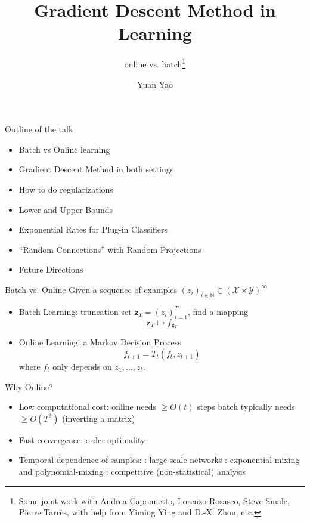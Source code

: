 \documentclass[pdf,slideColor,colorBG]{prosper}
\title{Gradient Descent Method in Learning}
\subtitle{online vs. batch\footnote{Some joint work with Andrea Caponnetto, Lorenzo Rosasco, Steve Smale, Pierre Tarr\`es, with help from
Yiming Ying and D.-X. Zhou, etc.}}
\author{Yuan Yao}
\theoremstyle{theorem}
\theoremstyle{definition}
\theoremstyle{remark}
\def\X{{\mathcal X}}
\def\Y{{\mathcal Y}}
\def\N{{\mathbb N}}
\def\z{{\mathbf z}}
\begin{document}
\maketitle

\begin{slide}{Outline of the talk}
\begin{itemize}
    \item Batch vs Online learning
    \item Gradient Descent Method in both settings
    \item How to do regularizations
    \item Lower and Upper Bounds
    \item Exponential Rates for Plug-in Classifiers
    \item ``Random Connections'' with Random Projections
    \item Future Directions
\end{itemize}

\end{slide}

%
\begin{slide}{Batch vs. Online}
Given a sequence of examples $(z_i)_{i\in \N}\in (\X\times \Y)^\infty$

\begin{itemize}
    \item Batch Learning: truncation set $\z_T=(z_i)_{i=1}^T$, find a mapping
\[ \z_T \mapsto f_{\z_T} \]

    \item Online Learning: a Markov Decision Process
\[ f_{t+1} = T_t(f_{t},z_{t+1}) \]
where $f_t$ only depends on $z_1,\ldots,z_t$.

\end{itemize}
\end{slide}


%
\begin{slide}{Why Online?}
\begin{itemize}
    \item Low computational cost:
        \subitem online needs $\geq O(t)$ steps
        \subitem batch typically needs $\geq O(T^3)$ (inverting a matrix)
    \item Fast convergence: order optimality
    \item Temporal dependence of samples:
        : large-scale networks
        : exponential-mixing and polynomial-mixing
        : competitive (non-statistical) analysis
\end{itemize}
\end{slide}
\end{document}
